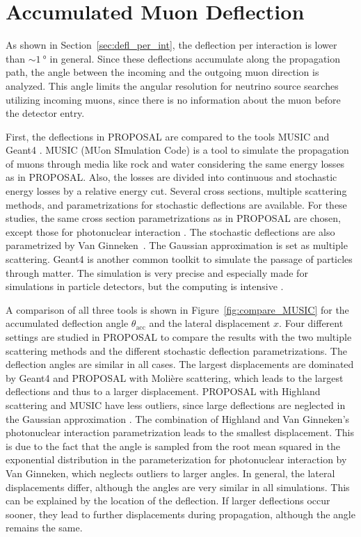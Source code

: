 \section{Accumulated Muon Deflection}\label{sec:accum_defl}

As shown in Section~\ref{sec:defl_per_int}, the deflection per interaction 
is lower than $\sim\SI{1}{\degree}$ in general. Since these deflections accumulate along the 
propagation path, the angle between the incoming and the outgoing 
muon direction is analyzed. This angle limits the angular resolution 
for neutrino source searches utilizing incoming muons, since there is no information 
about the muon before the detector entry.

First, the deflections in PROPOSAL are compared to 
the tools MUSIC \cite{MUSIC,comparison_MUSIC_GEANT4_2009} and Geant4 \cite{GEANT4}.
MUSIC (MUon SImulation Code) is a tool to simulate the propagation of muons 
through media like rock and water considering the same energy losses as in 
PROPOSAL. Also, the losses are divided into continuous and stochastic 
energy losses by a relative energy cut. Several cross sections, multiple scattering 
methods, and parametrizations for stochastic deflections are 
available. For these studies, the same cross section parametrizations 
as in PROPOSAL are chosen, except those for 
photonuclear interaction \cite{nulcint_bugaev_Shlepin, bugaev_1980_defl,bugaev_1981_defl}. The stochastic deflections are also parametrized by 
Van Ginneken~\cite{Van_Ginneken}. 
The Gaussian 
approximation \cite{HIGHLAND_1975} is set as multiple scattering. 
Geant4 is another common toolkit to simulate the passage of particles through 
matter. The simulation is very precise and especially 
made for simulations in particle detectors, but the computing is 
intensive \cite{GEANT4}. 

A comparison of all three tools is shown in Figure~\ref{fig:compare_MUSIC} 
for the 
accumulated deflection angle $\theta_{\text{acc}}$ and the lateral displacement
$x$. Four different settings are studied in PROPOSAL to compare the results with 
the two multiple scattering methods and the different stochastic deflection parametrizations.
The deflection angles are 
similar in all cases. The 
largest displacements are dominated by Geant4 and PROPOSAL with Molière scattering, which 
leads to the largest deflections and thus to a larger displacement. 
PROPOSAL with Highland scattering and MUSIC have less outliers, since large 
deflections are neglected in the Gaussian approximation \cite{HIGHLAND_1975}. 
The combination of Highland and 
Van Ginneken's photonuclear interaction parametrization leads to the smallest 
displacement. This is due to the fact that the angle is sampled from the root mean squared in the exponential distribution
in the parameterization for photonuclear interaction by Van Ginneken, which neglects 
outliers to larger angles. 
In general, the lateral displacements differ, although the angles are very similar in all simulations. 
This can be explained by the location of the deflection. If larger deflections occur sooner, 
they lead to further displacements during propagation, although the angle remains the same.

